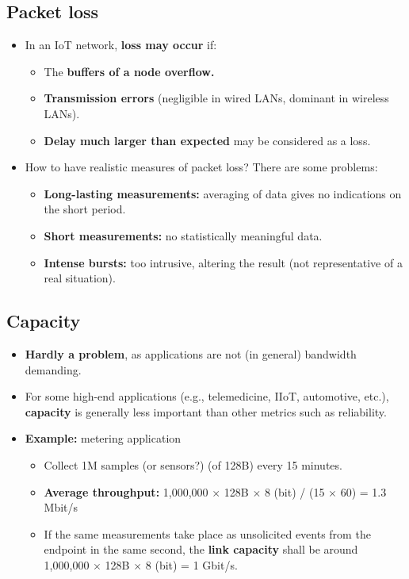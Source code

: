\subsection{Packet loss}
\begin{itemize}
    \item In an IoT network, \textbf{loss may occur} if:
    \begin{itemize}
        \item The \textbf{buffers of a node overflow.}
        \item \textbf{Transmission errors} (negligible in wired LANs, dominant in wireless LANs).
        \item \textbf{Delay much larger than expected} may be considered as a loss.
    \end{itemize}
    
    \item How to have realistic measures of packet loss? There are some problems:
    \begin{itemize}
        \item \textbf{Long-lasting measurements:} averaging of data gives no indications on the short period.
        \item \textbf{Short measurements:} no statistically meaningful data.
        \item \textbf{Intense bursts:} too intrusive, altering the result (not representative of a real situation).
    \end{itemize}
\end{itemize}

\subsection{Capacity}
\begin{itemize}
    \item \textbf{Hardly a problem}, as applications are not (in general) bandwidth demanding.
    \item For some high-end applications (e.g., telemedicine, IIoT, automotive, etc.), \textbf{capacity} is generally less important than other metrics such as reliability.
    \item \textbf{Example:} metering application
    \begin{itemize}
        \item Collect 1M samples (or sensors?) (of 128B) every 15 minutes.
        \item \textbf{Average throughput:} 1,000,000 $\times$ 128B $\times$ 8 (bit) / (15 $\times$ 60) = 1.3 Mbit/s
        \item If the same measurements take place as unsolicited events from the endpoint in the same second, the \textbf{link capacity} shall be around 1,000,000 $\times$ 128B $\times$ 8 (bit) = 1 Gbit/s.
    \end{itemize}
\end{itemize}

